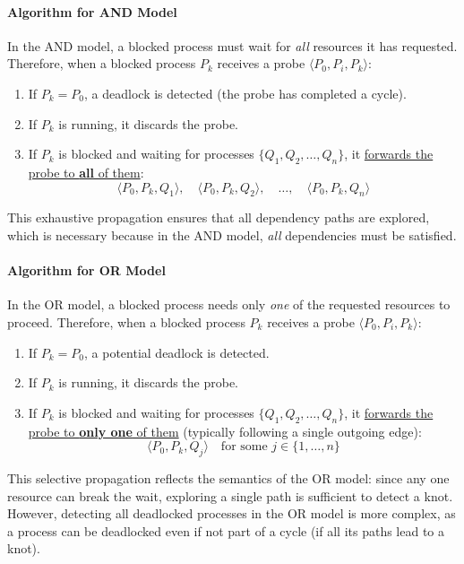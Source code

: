 \paragraph{Algorithm for AND Model}
In the AND model, a blocked process must wait for \textit{all} resources it has requested. Therefore, when a blocked process $P_k$ receives a probe $\langle P_0, P_i, P_k \rangle$:
\begin{enumerate}
   \item If $P_k = P_0$, a deadlock is detected (the probe has completed a cycle).
   \item If $P_k$ is running, it discards the probe.
   \item If $P_k$ is blocked and waiting for processes $\{Q_1, Q_2, \ldots, Q_n\}$, it \ul{forwards the probe to \textbf{all} of them}:
   \[
   \langle P_0, P_k, Q_1 \rangle, \quad \langle P_0, P_k, Q_2 \rangle, \quad \ldots, \quad \langle P_0, P_k, Q_n \rangle
   \]
\end{enumerate}

This exhaustive propagation ensures that all dependency paths are explored, which is necessary because in the AND model, \textit{all} dependencies must be satisfied.

\paragraph{Algorithm for OR Model}
In the OR model, a blocked process needs only \textit{one} of the requested resources to proceed. Therefore, when a blocked process $P_k$ receives a probe $\langle P_0, P_i, P_k \rangle$:
\begin{enumerate}
   \item If $P_k = P_0$, a potential deadlock is detected.
   \item If $P_k$ is running, it discards the probe.
   \item If $P_k$ is blocked and waiting for processes $\{Q_1, Q_2, \ldots, Q_n\}$, it \ul{forwards the probe to \textbf{only one} of them} (typically following a single outgoing edge):
   \[
   \langle P_0, P_k, Q_j \rangle \quad \text{for some } j \in \{1, \ldots, n\}
   \]
\end{enumerate}

This selective propagation reflects the semantics of the OR model: since any one resource can break the wait, exploring a single path is sufficient to detect a knot. However, detecting all deadlocked processes in the OR model is more complex, as a process can be deadlocked even if not part of a cycle (if all its paths lead to a knot).

